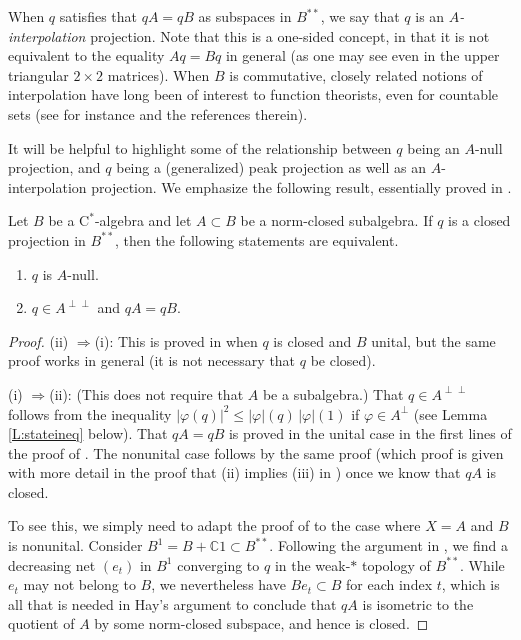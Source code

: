 \documentclass[10pt]{amsart}
\newcommand{\bC}{{\mathbb{C}}}
\newcommand{\rC}{\mathrm{C}}
\renewcommand{\phi}{\varphi}
\theoremstyle{definition}
\begin{document}
When $q$ satisfies that 
$qA=qB$ as subspaces in $B^{**}$, we say that $q$ is an \emph{$A$-interpolation} projection. Note that this is a one-sided concept, in that it is not equivalent to the equality 
$Aq = Bq$ in general (as one may see even in the upper triangular $2 \times 2$ matrices). 
When $B$ is commutative, closely related notions of interpolation have long been of interest to function theorists, even for countable sets (see for instance \cite{AHMR2019interp} and the references therein). 

It will be helpful to highlight some of the relationship between $q$ being an $A$-null projection, and $q$ being a (generalized) peak projection as well as an $A$-interpolation projection.  We emphasize the following  result, essentially  proved in \cite{CT2023Henkin}. 

\bigskip 

 Let $B$ be a $\rC^*$-algebra 
 and let $A \subset B$ be a norm-closed subalgebra. If $q$ is a closed projection in $B^{**}$, 
 then the following statements are equivalent.
\begin{enumerate}[{\rm (i)}] 
\item $q$ is $A$-null.
\item $q \in A^{\perp\perp}$ and 
$qA = qB$.
\end{enumerate} 


\begin{proof} 
(ii) $\Rightarrow$(i): This is proved in  \cite[Theorem 6.2]{CT2023Henkin} when $q$ is closed and $B$ unital, but the same proof works in general  (it is not necessary that $q$ be closed). 


(i) $\Rightarrow$(ii): (This does not require that $A$ be a subalgebra.) That $q \in A^{\perp\perp}$ follows from the inequality 
 $|\phi(q)|^2 \leq |\phi|(q) \, |\phi|(1) $ if $\phi \in A^{\perp}$ (see Lemma \ref{L:stateineq} 
below). 
That 
$qA = qB$ is proved in the unital case in the first lines of the proof of \cite[Proposition 3.4]{hay2007}.  The nonunital case follows by the same proof 
 (which proof is given with more detail in  the proof that (ii) implies (iii) in \cite[Theorem 6.2]{CT2023Henkin}) 
once we know that 
$qA$ is closed.   

To see this, we simply need to adapt the proof  of \cite[Proposition 3.1]{hay2007} to the case where $X=A$ and $B$ is nonunital. Consider $B^1=B+\bC 1\subset B^{**}$. Following the argument in \cite{hay2007}, we find a decreasing net $(e_t)$ in $B^1$ converging to $q$ in the weak-$*$ topology of $B^{**}$. While $e_t$ may not belong to $B$, we nevertheless have 
$Be_t  \subset B$ for each index $t$, which is all that is needed in Hay's argument to conclude that $qA$ is isometric to the quotient of $A$ by some norm-closed subspace, and hence is closed.
\end{proof} 
\end{document}
